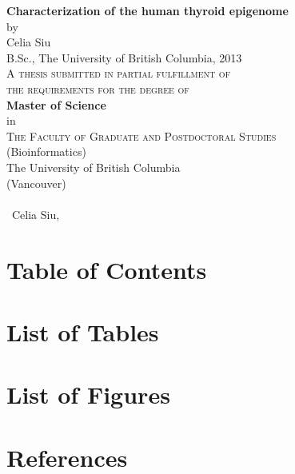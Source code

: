 \documentclass{article}
\newcommand{\thesistitle}{Characterization of the human thyroid epigenome}
\newcommand{\studentname}{Celia Siu}
\newcommand{\previousdegree}{B.Sc., The University of British Columbia, 2013}
\newcommand{\degreename}{Master of Science}
\newcommand{\program}{Bioinformatics}
\newcommand{\campus}{Vancouver}
\newcommand{\gradmonth}{\monthname}  %
\newcommand{\gradyear}{\the\year}    %
\renewcommand{\maketitle}{
	\begin{titlepage}
	\null\vfil\par
	\begin{center}\setlength{\baselineskip}{20pt}
		{\Large \textbf{\thesistitle}}\\[1em]

		{\Large by}\\[1em]
		{\Large \studentname}\\[1em]
		{\Large \previousdegree}\\[1em]

		{\Large \textsc{A thesis submitted in partial fulfillment of}}\\
		{\Large \textsc{the requirements for the degree of}}\\[1em]

		{\Large \textbf{\degreename}}\\[1em]
		{\Large in}\\[1em]
		{\Large \textsc{The Faculty of Graduate and Postdoctoral Studies}}\\[1em]
		{\Large (\program)}\\[1em]

		{\Large The University of British Columbia}\\
		{\Large (\campus)}\\[1em]
		{\Large \gradmonth\ \gradyear}\\[1em]
		{\Large \textcopyright\ \studentname, \gradyear}
	\end{center}
	\vfill\null
	\end{titlepage}
}
\begin{document}
\maketitle

\setcounter{page}{2}




\pagebreak
\section{Table of Contents}
\tableofcontents

\pagebreak
\section{List of Tables}
\listoftables

\pagebreak
\section{List of Figures}
\listoffigures








\pagebreak
{}


\pagebreak
\section{References}
\renewcommand{\section}[2]{}



\end{document}
